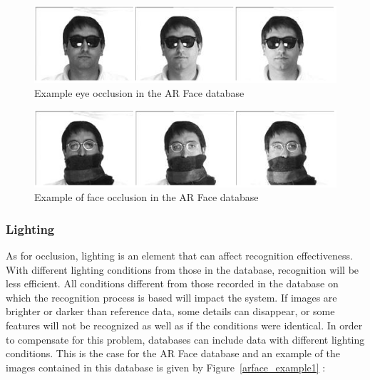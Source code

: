 \begin{figure}[!h]
\begin{center}
\noindent \includegraphics[scale=0.7]{figures/arface_example2} 
\newline
\caption{Example eye occlusion in the AR Face database}
\label{arface_example2}
\end{center} 
\end{figure}

\begin{figure}[!h]
\begin{center}
\noindent \includegraphics[scale=0.7]{figures/arface_example3} 
\newline
\caption{Example of face occlusion in the AR Face database}
\label{arface_example3}
\end{center} 
\end{figure} 

\subsubsection{Lighting}

\vspace{\baselineskip}
\noindent As for occlusion, lighting is an element that can affect recognition effectiveness. With different lighting conditions from those in the database, recognition will be less efficient. All conditions different from those recorded  in the database on which the recognition process is based will impact the system. If images are brighter or darker than reference data, some details can disappear, or some features will not be recognized as well as if the conditions were identical. In order to compensate for this problem, databases can include data with different lighting conditions. This is the case for the AR Face database and an example of the images contained in this database is given by Figure~\ref{arface_example1} \cite{ARFACE}:
\newline

